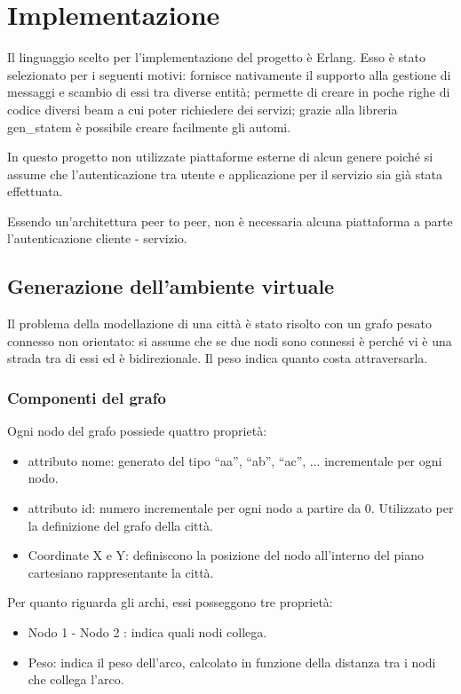 
\chapter{Implementazione}

Il linguaggio scelto per l'implementazione del progetto è Erlang. Esso è stato selezionato per i seguenti motivi: fornisce nativamente il supporto alla gestione di messaggi e scambio di essi tra diverse entità; permette di creare in poche righe di codice diversi beam a cui poter richiedere dei servizi; grazie alla libreria gen\_statem è possibile creare facilmente gli automi.

In questo progetto non utilizzate piattaforme esterne di alcun genere poiché si assume che l'autenticazione tra utente e applicazione per il servizio sia già stata effettuata.

Essendo un'architettura peer to peer, non è necessaria alcuna piattaforma a parte l'autenticazione cliente - servizio.

\section{Generazione dell'ambiente virtuale}
Il problema della modellazione di una città è stato risolto con un grafo pesato connesso non orientato: si assume che se due nodi sono connessi è perché vi è una strada tra di essi ed è bidirezionale. Il peso indica quanto costa attraversarla. 

\subsection{Componenti del grafo}
Ogni nodo del grafo possiede quattro proprietà:
\begin{itemize}
	\item attributo nome: generato del tipo ``aa'', ``ab'', ``ac'', ... incrementale per ogni nodo.
	\item attributo id: numero incrementale per ogni nodo a partire da 0. Utilizzato per la definizione del grafo della città.
	\item Coordinate X e Y: definiscono la posizione del nodo all'interno del piano cartesiano rappresentante la città.
\end{itemize}

Per quanto riguarda gli archi, essi posseggono tre proprietà:
\begin{itemize}
	\item Nodo 1 - Nodo 2 : indica quali nodi collega.
	\item Peso: indica il peso dell'arco, calcolato in funzione della distanza tra i nodi che collega l'arco.
\end{itemize}

